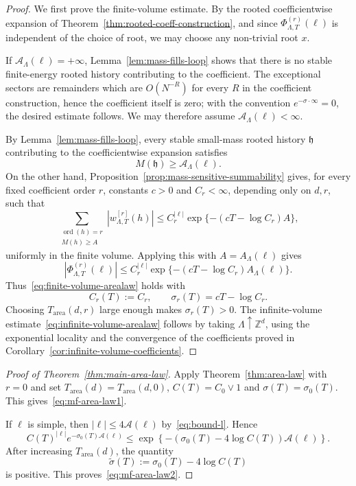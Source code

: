 \documentclass[11pt,a4paper,reqno]{amsart}
\theoremstyle{definition}
\theoremstyle{remark}
\newcommand\Z{{\mathbb{Z}}}
\begin{document}
\begin{proof}
We first prove the finite-volume estimate.  By the rooted coefficientwise expansion of Theorem~\ref{thm:rooted-coeff-construction}, and since $\Phi_{\Lambda,T}^{(r)}(\ell)$ is independent of the choice of root, we may choose any non-trivial root $x$.

If $\mathcal A_\Lambda(\ell)=+\infty$, Lemma~\ref{lem:mass-fills-loop} shows that there is no stable finite-energy rooted history contributing to the coefficient. The exceptional sectors are remainders which are $O(N^{-R})$ for every $R$ in the coefficient construction, hence the coefficient itself is zero; with the convention $e^{-\sigma\cdot\infty}=0$, the desired estimate follows. We may therefore assume $\mathcal A_\Lambda(\ell)<\infty$.

By Lemma~\ref{lem:mass-fills-loop}, every stable small-mass rooted history $\mathfrak h$ contributing to the coefficientwise expansion satisfies
\begin{equation}
M(\mathfrak h)\ge \mathcal A_\Lambda(\ell).
\end{equation}
On the other hand, Proposition~\ref{prop:mass-sensitive-summability} gives, for every fixed coefficient order
\(r\), constants \(c>0\) and \(C_r<\infty\), depending only on \(d,r\), such that
\[
\sum_{\substack{\operatorname{ord}(h)=r\\ M(h)\ge A}}
\left|w^{[r]}_{\Lambda,T}(h)\right|
\le
C_r^{|\ell|}
\exp\{-(cT-\log C_r)A\},
\]
uniformly in the finite volume. Applying this with \(A=A_\Lambda(\ell)\) gives
\[
\left|\Phi^{(r)}_{\Lambda,T}(\ell)\right|
\le
C_r^{|\ell|}
\exp\{-(cT-\log C_r)A_\Lambda(\ell)\}.
\]
Thus~\eqref{eq:finite-volume-arealaw} holds with
\[
C_r(T):=C_r,\qquad \sigma_r(T)=cT-\log C_r.
\]
Choosing $T_{\mathrm{area}}(d,r)$ large enough makes $\sigma_r(T)>0$.  The infinite-volume estimate~\eqref{eq:infinite-volume-arealaw} follows by taking $\Lambda\uparrow\Z^d$, using the exponential locality and the convergence of the coefficients proved in Corollary~\ref{cor:infinite-volume-coefficients}.
\end{proof}

\begin{proof}[Proof of Theorem~\ref{thm:main-area-law}]
Apply Theorem~\ref{thm:area-law} with $r=0$ and set $T_{\mathrm{area}}(d)=T_{\mathrm{area}}(d,0)$, $C(T)=C_0\vee1$ and $\sigma(T)=\sigma_0(T)$. This gives~\eqref{eq:mf-area-law1}.

If $\ell$ is simple, then $|\ell|\le4\mathcal A(\ell)$ by~\eqref{eq:bound-l}.  Hence
\[
C(T)^{|\ell|}
e^{-\sigma_0(T)\mathcal A(\ell)}
\le
\exp\left\{
-\left(\sigma_0(T)-4\log C(T)\right)\mathcal A(\ell)
\right\}.
\]
After increasing $T_{\mathrm{area}}(d)$, the quantity
\[
\widetilde\sigma(T):=
\sigma_0(T)-4\log C(T)
\]
is positive.  This proves~\eqref{eq:mf-area-law2}.
\end{proof}
\end{document}
